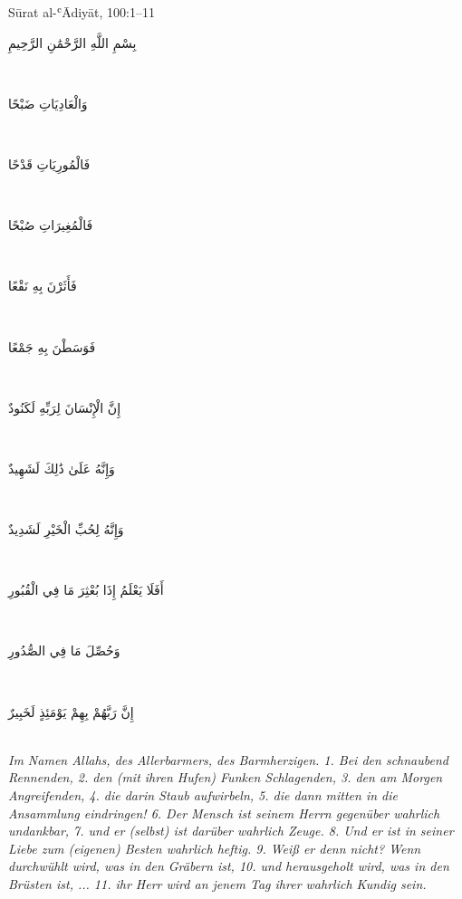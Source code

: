 \begin{quranvers}{Sūrat al-ʿĀdiyāt, 100:1--11}
{\quranfont\begin{Arabic}
بِسْمِ اللَّهِ الرَّحْمَٰنِ الرَّحِيمِ
\end{Arabic}}\\[2mm]
{\quranfont\begin{Arabic}
وَالْعَادِيَاتِ ضَبْحًا
\end{Arabic}}\\[2mm]
{\quranfont\begin{Arabic}
فَالْمُورِيَاتِ قَدْحًا
\end{Arabic}}\\[2mm]
{\quranfont\begin{Arabic}
فَالْمُغِيرَاتِ صُبْحًا
\end{Arabic}}\\[2mm]
{\quranfont\begin{Arabic}
فَأَثَرْنَ بِهِ نَقْعًا
\end{Arabic}}\\[2mm]
{\quranfont\begin{Arabic}
فَوَسَطْنَ بِهِ جَمْعًا
\end{Arabic}}\\[2mm]
{\quranfont\begin{Arabic}
إِنَّ الْإِنْسَانَ لِرَبِّهِ لَكَنُودٌ
\end{Arabic}}\\[2mm]
{\quranfont\begin{Arabic}
وَإِنَّهُ عَلَىٰ ذَٰلِكَ لَشَهِيدٌ
\end{Arabic}}\\[2mm]
{\quranfont\begin{Arabic}
وَإِنَّهُ لِحُبِّ الْخَيْرِ لَشَدِيدٌ
\end{Arabic}}\\[2mm]
{\quranfont\begin{Arabic}
أَفَلَا يَعْلَمُ إِذَا بُعْثِرَ مَا فِي الْقُبُورِ
\end{Arabic}}\\[2mm]
{\quranfont\begin{Arabic}
وَحُصِّلَ مَا فِي الصُّدُورِ
\end{Arabic}}\\[2mm]
{\quranfont\begin{Arabic}
إِنَّ رَبَّهُمْ بِهِمْ يَوْمَئِذٍ لَخَبِيرٌ
\end{Arabic}}\\[3mm]
\emph{Im Namen Allahs, des Allerbarmers, des Barmherzigen. 1. Bei den schnaubend Rennenden,
2. den (mit ihren Hufen) Funken Schlagenden, 3. den am Morgen Angreifenden, 4. die darin
Staub aufwirbeln, 5. die dann mitten in die Ansammlung eindringen! 6. Der Mensch ist seinem
Herrn gegenüber wahrlich undankbar, 7. und er (selbst) ist darüber wahrlich Zeuge. 8. Und er ist
in seiner Liebe zum (eigenen) Besten wahrlich heftig. 9. Weiß er denn nicht? Wenn durchwühlt
wird, was in den Gräbern ist, 10. und herausgeholt wird, was in den Brüsten ist, ... 11. ihr Herr
wird an jenem Tag ihrer wahrlich Kundig sein.}
\end{quranvers}

